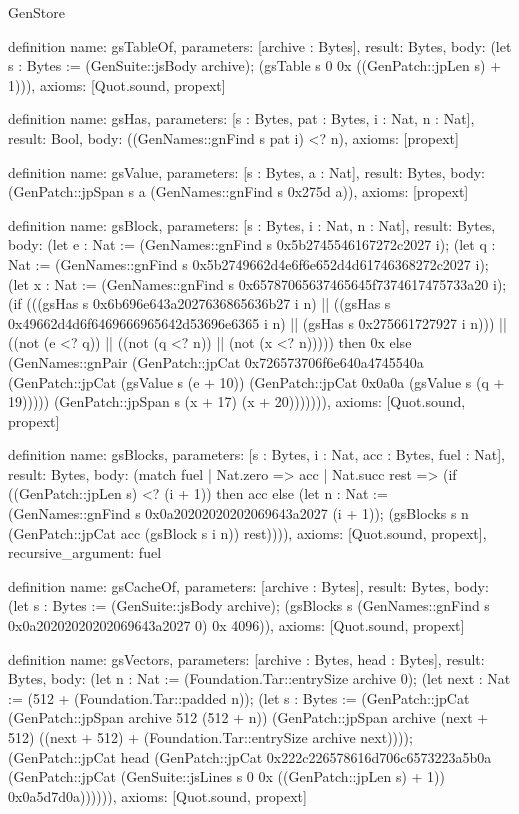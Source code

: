 \begin{lexlean}{GenStore}
\begin{semanticmodule}
definition{
  name: gsTableOf,
  parameters: [archive : Bytes],
  result: Bytes,
  body: (let s : Bytes := (GenSuite::jsBody archive); (gsTable s 0 0x ((GenPatch::jpLen s) + 1))),
  axioms: [Quot.sound, propext]
}

definition{
  name: gsHas,
  parameters: [s : Bytes, pat : Bytes, i : Nat, n : Nat],
  result: Bool,
  body: ((GenNames::gnFind s pat i) <? n),
  axioms: [propext]
}

definition{
  name: gsValue,
  parameters: [s : Bytes, a : Nat],
  result: Bytes,
  body: (GenPatch::jpSpan s a (GenNames::gnFind s 0x275d a)),
  axioms: [propext]
}

definition{
  name: gsBlock,
  parameters: [s : Bytes, i : Nat, n : Nat],
  result: Bytes,
  body: (let e : Nat := (GenNames::gnFind s 0x5b2745546167272c2027 i); (let q : Nat := (GenNames::gnFind s 0x5b2749662d4e6f6e652d4d61746368272c2027 i); (let x : Nat := (GenNames::gnFind s 0x65787065637465645f7374617475733a20 i); (if (((gsHas s 0x6b696e643a2027636865636b27 i n) || ((gsHas s 0x49662d4d6f6469666965642d53696e6365 i n) || (gsHas s 0x275661727927 i n))) || ((not (e <? q)) || ((not (q <? n)) || (not (x <? n))))) then 0x else (GenNames::gnPair (GenPatch::jpCat 0x726573706f6e640a4745540a (GenPatch::jpCat (gsValue s (e + 10)) (GenPatch::jpCat 0x0a0a (gsValue s (q + 19))))) (GenPatch::jpSpan s (x + 17) (x + 20))))))),
  axioms: [Quot.sound, propext]
}

definition{
  name: gsBlocks,
  parameters: [s : Bytes, i : Nat, acc : Bytes, fuel : Nat],
  result: Bytes,
  body: (match fuel
    | Nat.zero => acc
    | Nat.succ rest => (if ((GenPatch::jpLen s) <? (i + 1)) then acc else (let n : Nat := (GenNames::gnFind s 0x0a20202020202069643a2027 (i + 1)); (gsBlocks s n (GenPatch::jpCat acc (gsBlock s i n)) rest)))),
  axioms: [Quot.sound, propext],
  recursive_argument: fuel
}

definition{
  name: gsCacheOf,
  parameters: [archive : Bytes],
  result: Bytes,
  body: (let s : Bytes := (GenSuite::jsBody archive); (gsBlocks s (GenNames::gnFind s 0x0a20202020202069643a2027 0) 0x 4096)),
  axioms: [Quot.sound, propext]
}

definition{
  name: gsVectors,
  parameters: [archive : Bytes, head : Bytes],
  result: Bytes,
  body: (let n : Nat := (Foundation.Tar::entrySize archive 0); (let next : Nat := (512 + (Foundation.Tar::padded n)); (let s : Bytes := (GenPatch::jpCat (GenPatch::jpSpan archive 512 (512 + n)) (GenPatch::jpSpan archive (next + 512) ((next + 512) + (Foundation.Tar::entrySize archive next)))); (GenPatch::jpCat head (GenPatch::jpCat 0x222c226578616d706c6573223a5b0a (GenPatch::jpCat (GenSuite::jsLines s 0 0x ((GenPatch::jpLen s) + 1)) 0x0a5d7d0a)))))),
  axioms: [Quot.sound, propext]
}
\end{semanticmodule}
\end{lexlean}
